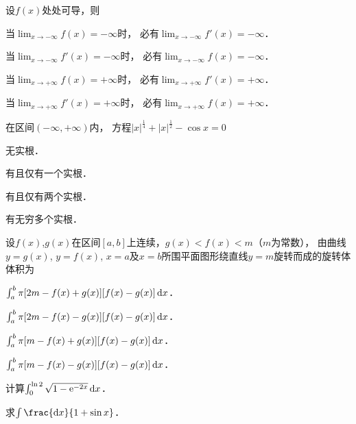 \documentclass[plain,noanswer,medmath]{../../template/jnuexam}
\begin{document}
\begin{problem}
设$f(x)$处处可导，则\pickout{}
\begin{abcd}
\item 当$\lim_{x \to -\infty} f(x) = -\infty$时，
      必有$\lim_{x \to -\infty} f'(x) = -\infty$．
\item 当$\lim_{x \to -\infty} f'(x) = -\infty$时，
      必有$\lim_{x \to -\infty} f(x) = -\infty$．
\item 当$\lim_{x \to +\infty} f(x) = +\infty$时，
      必有$\lim_{x \to +\infty} f'(x) = +\infty$．
\item 当$\lim_{x \to +\infty} f'(x) = +\infty$时，
      必有$\lim_{x \to +\infty} f(x) = +\infty$．
\end{abcd}
\end{problem}


\begin{problem}
在区间$(-\infty , +\infty)$内，
方程$|x|^{\frac{1}{4}} + |x|^{\frac{1}{2}} - \cos x = 0$\pickout{}
\begin{abcd}
\item 无实根．						
\item 有且仅有一个实根．
\item 有且仅有两个实根．			
\item 有无穷多个实根．
\end{abcd}
\end{problem}


\begin{problem}
设$f(x)$,$g(x)$在区间$[a,b]$上连续，$g(x) < f(x) < m$（$m$为常数），
由曲线$y = g(x)$, $y = f(x)$, $x = a$及$x = b$所围平面图形绕直线$y = m$旋转而成的旋转体体积为\pickout{}
\begin{abcd}
\item $\int_a^b \pi[2m - f(x) + g(x)][f(x) - g(x)]\mathop{}\!\mathrm{d} x$．
\item $\int_a^b \pi[2m - f(x) - g(x)][f(x) - g(x)]\mathop{}\!\mathrm{d} x$．
\item $\int_a^b \pi[m - f(x) + g(x)][f(x) - g(x)]\mathop{}\!\mathrm{d} x$．
\item $\int_a^b \pi[m - f(x) - g(x)][f(x) - g(x)]\mathop{}\!\mathrm{d} x$．
\end{abcd}
\end{problem}




\begin{problem}
计算$\int_0^{\ln 2} \sqrt{1 - \mathrm{e}^{-2x}} \mathop{}\!\mathrm{d} x$．
\end{problem}


\begin{problem}
求$\int \frac{\dx}{1 + \sin x}$．
\end{problem}
\end{document}
